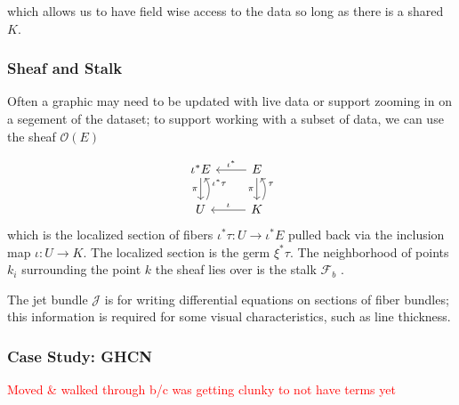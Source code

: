 \documentclass[../main.tex]{subfiles}
\begin{document}
which allows us to have field wise access to the data so long as there is a shared $K$.  


\subsubsection{Sheaf and Stalk}
\label{sec:data_sheaf_stalk}
Often a graphic may need to be updated with live data or support zooming in on a segement of the dataset; to support working with a subset of data, we can use the sheaf $\mathcal{O}(E)$

\begin{equation}
    \label{eq:sheaf}
    \begin{tikzcd}
        \iota^*E \arrow[d, "\pi"']           & E \arrow[d, "\pi"'] \arrow[l, "\iota^*"']         \\
        U \arrow[u, "\iota^*\tau"', bend right] & K \arrow[u, "\tau"', bend right] \arrow[l, "\iota"']
        \end{tikzcd}
\end{equation}
which is the localized section of fibers $\iota^*\tau: U \rightarrow \iota^*E$ pulled back via the inclusion map $\iota: U \rightarrow K$. The localized section is the germ $\xi^*\tau$. The neighborhood of points $k_i$ surrounding the point $k$ the sheaf lies over is the stalk $\mathcal{F}_b$ \cite{StalkSheaf2019,spanier1989algebraic}.

The jet bundle $\mathcal{J}$ \cite{JetBundle2020,musilovaCalculusVariationsJet2016} is for writing differential equations on sections of fiber bundles; this information is required for some visual characteristics, such as line thickness. 

\subsubsection{Case Study: GHCN}
\textcolor{red}{Moved \& walked through b/c was getting clunky to not have terms yet}\\

\end{document}
